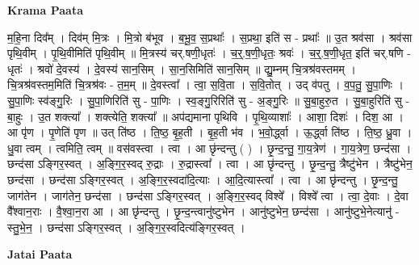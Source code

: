 \documentclass[17pt]{extarticle}
\begin{document}
\textbf{Krama Paata} \newline

म॒हि॒ना दिव᳚म् । दिव॑म् मि॒त्रः । मि॒त्रो ब॑भूव । ब॒भू॒व॒ स॒प्रथाः᳚ । स॒प्रथा॒ इति॑ स - प्रथाः᳚ ॥ उ॒त श्रव॑सा । श्रव॑सा पृथि॒वीम् । पृ॒थि॒वीमिति॑ पृथि॒वीम् ॥ मि॒त्रस्य॑ चर्.षणी॒धृतः॑ । च॒र्॒.ष॒णी॒धृतः॒ श्रवः॑ । च॒र्॒.ष॒णी॒धृत॒ इति॑ चर्.षणि - धृतः॑ । श्रवो॑ दे॒वस्य॑ । दे॒वस्य॑ सान॒सिम् । सा॒न॒सिमिति॑ सान॒सिम् ॥ द्यु॒म्नम् चि॒त्रश्र॑वस्तमम् । चि॒त्रश्र॑वस्तम॒मिति॑ चि॒त्रश्र॑वः - त॒म॒म् ॥ दे॒वस्त्वा᳚ । त्वा॒ स॒वि॒ता । स॒वि॒तोत् । उद् व॑पतु । व॒प॒तु॒ सु॒पा॒णिः । सु॒पा॒णिः स्व॑ङ्गु॒रिः । सु॒पा॒णिरिति॑ सु - पा॒णिः । स्व॒ङ्गु॒रिरिति॑ सु - अ॒ङ्गु॒रिः ॥ सु॒बा॒हुरु॒त । सु॒बा॒हुरिति॑ सु - बा॒हुः । उ॒त शक्त्या᳚ । शक्त्येति॒ शक्त्या᳚ ॥ अप॑द्यमाना पृथिवि । पृ॒थि॒व्याशाः᳚ । आशा॒ दिशः॑ । दिश॒ आ । आ पृ॑ण । पृ॒णेति॑ पृण ॥ उत् ति॑ष्ठ । ति॒ष्ठ॒ बृ॒ह॒ती । बृ॒ह॒ती भ॑व । भ॒वो॒र्द्ध्वा । ऊ॒र्द्ध्वा ति॑ष्ठ । ति॒ष्ठ॒ ध्रु॒वा । धु॒वा त्वम् । त्वमिति॒ त्वम् ॥ वस॑वस्त्वा । त्वा । आ छृ॑न्दन्तु ( ) । छृ॒न्द॒न्तु॒ गा॒य॒त्रेण॑ । गा॒य॒त्रेण॒ छन्द॑सा । छन्द॑सा ऽङ्गिर॒स्वत् । अ॒ङ्गि॒र॒स्वद् रु॒द्राः । रु॒द्रास्त्वा᳚ । त्वा । आ छृ॑न्दन्तु । छृ॒न्द॒न्तु॒ त्रैष्टु॑भेन । त्रैष्टु॑भेन॒ छन्द॑सा । छन्द॑सा ऽङ्गिर॒स्वत् । अ॒ङ्गि॒र॒स्वदा॑दि॒त्याः । आ॒दि॒त्यास्त्वा᳚ । त्वा । आ छृ॑न्दन्तु । छृ॒न्द॒न्तु॒ जाग॑तेन । जाग॑तेन॒ छन्द॑सा । छन्द॑सा ऽङ्गिर॒स्वत् । अ॒ङ्गि॒र॒स्वद् विश्वे᳚ । विश्वे᳚ त्वा । त्वा॒ दे॒वाः । दे॒वा वै᳚श्वान॒राः । वै॒श्वा॒न॒रा आ । आ छृ॑न्दन्तु । छृ॒न्द॒न्त्वानु॑ष्टुभेन । आनु॑ष्टुभेन॒ छन्द॑सा । आनु॑ष्टुभे॒नेत्यानु॑ - स्तु॒भे॒न॒ । छन्द॑सा ऽङ्गिर॒स्वत् । अ॒ङ्गि॒र॒स्वदित्य॑ङ्गिर॒स्वत् । \newline

\textbf{Jatai Paata} \newline
\end{document}
